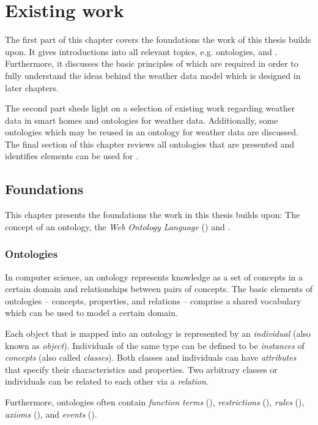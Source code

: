 \chapter{Existing work}
\label{ch:existing_work}

The first part of this chapter covers the foundations the work of this thesis builds upon. It gives introductions into all relevant topics, e.g. ontologies,  and . Furthermore, it discusses the basic principles of \thinkhome which are required in order to fully understand the ideas behind the weather data model which is designed in later chapters.

The second part sheds light on a selection of existing work regarding weather data in smart homes and ontologies for weather data. Additionally, some ontologies which may be reused in an ontology for weather data are discussed. The final section of this chapter reviews all ontologies that are presented and identifies elements can be used for \thinkhome.

\section{Foundations}

This chapter presents the foundations the work in this thesis builds upon: The concept of an ontology, the \emph{Web Ontology Language} () and \thinkhome.

\subsection{Ontologies}
\label{subsec:ontologies}

In computer science, an ontology represents knowledge as a set of concepts in a certain domain and relationships between pairs of concepts. The basic elements of ontologies -- concepts, properties, and relations -- comprise a shared vocabulary which can be used to model a certain domain.

Each object that is mapped into an ontology is represented by an \emph{individual} (also known as \emph{object}). Individuals of the same type can be defined to be \emph{instances} of \emph{concepts} (also called \emph{classes}). Both classes and individuals can have \emph{attributes} that specify their characteristics and properties. Two arbitrary classes or individuals can be related to each other via a \emph{relation}.

Furthermore, ontologies often contain \emph{function terms} (), \emph{restrictions} (), \emph{rules} (), \emph{axioms} (), and \emph{events} ().

